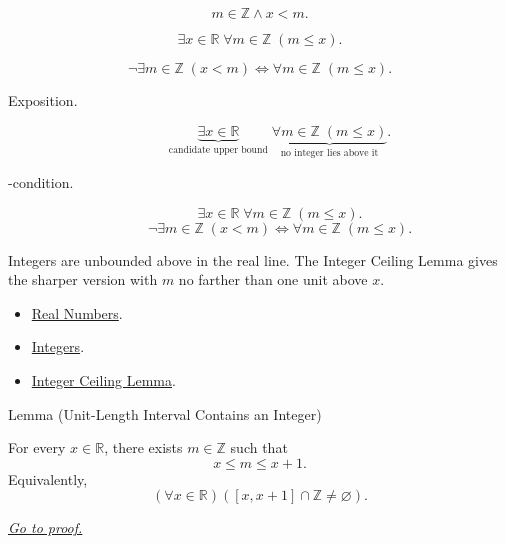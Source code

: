 \begin{remark*}
\[
m\in\mathbb{Z}\land x<m.
\]
\end{remark*}

\begin{remark*}
\[
\exists x\in\mathbb{R}\;\forall m\in\mathbb{Z}\;(m\le x).
\]
\end{remark*}

\begin{remark*}
\[
\neg\exists m\in\mathbb{Z}\;(x<m)
\Longleftrightarrow
\forall m\in\mathbb{Z}\;(m\le x).
\]
\end{remark*}

\begin{remark*}
\begin{description}
  \item[Exposition.]
\[
\underbrace{\exists x\in\mathbb{R}}_{\text{candidate upper bound}}
\;\underbrace{\forall m\in\mathbb{Z}\;(m\le x)}_{\text{no integer lies above it}}.
\]


  \item[\exists-condition.]
  \[
\exists x\in\mathbb{R}\;\forall m\in\mathbb{Z}\;(m\le x).
\]
\[
\neg\exists m\in\mathbb{Z}\;(x<m)
\Longleftrightarrow
\forall m\in\mathbb{Z}\;(m\le x).
\]
\end{description}
\end{remark*}

\begin{remark*}[Interpretation]
Integers are unbounded above in the real line. The Integer Ceiling Lemma gives
the sharper version with $m$ no farther than one unit above $x$.
\end{remark*}

\begin{dependencies}
\begin{itemize}
\item \hyperref[def:reals]{Real Numbers}.
\item \hyperref[def:integers]{Integers}.
\item \hyperref[lem:integer-ceiling-lemma]{Integer Ceiling Lemma}.
\end{itemize}
\end{dependencies}



\begin{lemmabox}{Lemma (Unit-Length Interval Contains an Integer)}
\begin{lemma}
\label{lem:unit-length-interval-contains-integer}
For every $x\in\mathbb{R}$, there exists $m\in\mathbb{Z}$ such that
\[
  x\leq m\leq x+1.
\]
Equivalently,
\[
  (\forall x\in\mathbb{R})([x,x+1]\cap\mathbb{Z}\neq\varnothing).
\]

\smallskip
\noindent
\hyperref[prf:unit-length-interval-contains-integer]{\textit{Go to proof.}}
\end{lemma}
\end{lemmabox}

